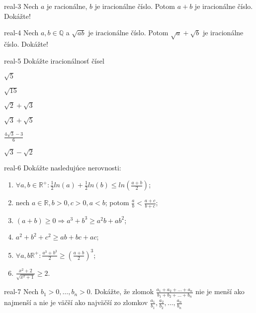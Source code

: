 \begin{defproblem}{real-3}
Nech $a$ je racionálne, $b$ je iracionálne číslo. Potom $a + b$ je
iracionálne číslo. Dokážte!
\end{defproblem}

\begin{defproblem}{real-4}
Nech $a, b \in \mathbb{Q}$ a $\sqrt{ab}$ je iracionálne číslo. Potom
$\sqrt{a} + \sqrt{b}$ je iracionálne číslo. Dokážte!
\end{defproblem}

\begin{defproblem}{real-5}
Dokážte iracionálnosť čísel

\begin{enumerate*}
  \item $\sqrt{5}$
  \item $\sqrt{15}$
  \item $\sqrt{2} + \sqrt{3}$
  \item $\sqrt{3} + \sqrt{5}$
  \item $\frac{4\sqrt{3} - 3}{6}$
  \item $\sqrt{3} - \sqrt{2}$
\end{enumerate*}
\end{defproblem}

\begin{defproblem}{real-6}
Dokážte nasledujúce nerovnosti:

\begin{enumerate}
  \item $\forall a, b \in \mathbb{R}^{+}: \frac{1}{2} ln(a) + \frac{1}{2} ln(b) \leq ln(\frac{a+b}{2})$;
  \item nech $a \in \mathbb{R}, b > 0, c > 0, a < b$; potom  $\frac{a}{b} < \frac{a + c}{b + c}$;
  \item $(a + b) \geq 0 \Rightarrow a^3 + b^3 \geq a^2 b + ab^2$;
  \item $a^2 + b^2 + c^2 \geq ab + bc + ac$;
  \item $\forall a, b \mathbb{R}^+ : \frac{a^3 + b^3}{2} \geq (\frac{a + b}{2})^3$;
  \item $\frac{x^2 + 2}{\sqrt{x^2 + 1}} \geq 2$.
\end{enumerate}
\end{defproblem}

\begin{defproblem}{real-7}
Nech $b_1 > 0, \ldots, b_n > 0$. Dokážte, že zlomok
$\frac{a_1 + a_2 + \ldots + a_n}{b_1 + b_2 + \ldots + b_n}$ nie je menší ako
najmenší a nie je väčší ako najväčší zo zlomkov
$\frac{a_1}{b_1}, \frac{a_2}{b_2}, \ldots, \frac{a_n}{b_n}$
\end{defproblem}

